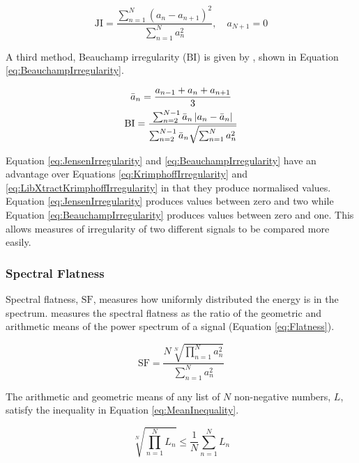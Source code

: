 			\begin{equation}
				\textrm{JI} = \frac{\sum_{n = 1}^{N} (a_{n} - a_{n+1})^{2}}
						   {\sum_{n = 1}^{N} a_{n}^{2}},
					      \quad a_{N+1} = 0
				\label{eq:JensenIrregularity}
			\end{equation}

			A third method, Beauchamp irregularity ($\textrm{BI}$) is given by \citet{beauchamp2007analysis},
			shown in Equation \ref{eq:BeauchampIrregularity}.

			\begin{gather}
			        \bar{a}_{n} = \frac{a_{n-1} + a_{n} + a_{n+1}}{3} \nonumber \\
				\textrm{BI} = \frac{\sum_{n = 2}^{N - 1} \bar{a}_{n} \left|a_{n} - \bar{a}_{n}\right|}
						   {\sum_{n = 2}^{N - 1} \bar{a}_{n} \sqrt{\sum_{n = 1}^{N} a_{n}^{2}}}
				\label{eq:BeauchampIrregularity}
			\end{gather}

			Equation \ref{eq:JensenIrregularity} and \ref{eq:BeauchampIrregularity} have an advantage over
			Equations \ref{eq:KrimphoffIrregularity} and \ref{eq:LibXtractKrimphoffIrregularity} in that they
			produce normalised values. Equation \ref{eq:JensenIrregularity} produces values between zero and
			two while Equation \ref{eq:BeauchampIrregularity} produces values between zero and one. This allows
			measures of irregularity of two different signals to be compared more easily.

		\subsubsection*{Spectral Flatness}
			Spectral flatness, $\textrm{SF}$, measures how uniformly distributed the energy is in the spectrum.
			\citet{johnston1988transform} measures the spectral flatness as the ratio of the geometric and
			arithmetic means of the power spectrum of a signal (Equation \ref{eq:Flatness}).

			\begin{equation}
				\textrm{SF} = \frac{N\sqrt[N]{\prod_{n = 1}^{N} a_{n}^{2}}}
						   {\sum_{n = 1}^{N} a_{n}^{2}}
				\label{eq:Flatness}
			\end{equation}

			The arithmetic and geometric means of any list of $N$ non-negative numbers, $L$, satisfy the
			inequality in Equation \ref{eq:MeanInequality}.

			\begin{equation}
				\sqrt[N]{\prod_{n = 1}^{N} L_{n}} \leq \frac{1}{N} \sum_{n = 1}^{N} L_{n}
				\label{eq:MeanInequality}
			\end{equation}

